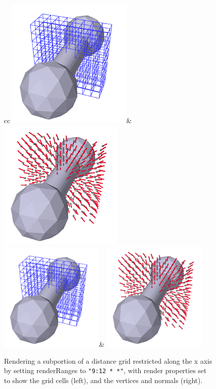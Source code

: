 \begin{figure}[ht]
\begin{center}
  \begin{tabular}{cc}
    \iflatexml
       \includegraphics[]{images/dumbbellDistanceGridSub}&
       \includegraphics[]{images/dumbbellDistanceGridGrad}
    \else
       \includegraphics[width=2in]{images/dumbbellDistanceGridSub}&
       \includegraphics[width=2in]{images/dumbbellDistanceGridGrad}
    \fi
  \end{tabular}
\end{center}
\caption{Rendering a subportion of a distance grid
restricted along the x axis by setting {\sf renderRanges} 
to {\tt "9:12 * *"}, with render properties set to show the grid cells
(left), and the vertices and normals (right).}
\label{rigidBodySubGrid:fig}
\end{figure}

